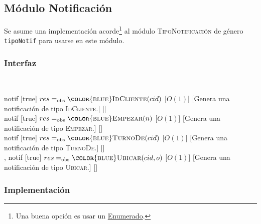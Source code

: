\subsection{Módulo Notificación}
Se asume una implementación acorde\footnote{Una buena opción es usar un \href{https://en.wikipedia.org/wiki/Enumerated_type}{Enumerado}.} al módulo \textsc{TipoNotificación} de género \texttt{tipoNotif} para usarse en este módulo.
\begin{interfaz}{\subsubsection{Interfaz}}
  \\
  \usa{\falta}
  \par\noindent
  \begin{operaciones}
    {}{notif}
    [true]
    {$res\igobs\textsc{\color{blue}IdCliente}(cid)$}
    [$O(1)$]
    [Genera una notificación de tipo \textsc{\color{teal}IdCliente}.]
    [\falta]\\

    \noindent{}
    {}{notif}
    [true]
    {$res\igobs\textsc{\color{blue}Empezar}(n)$}
    [$O(1)$]
    [Genera una notificación de tipo \textsc{\color{teal}Empezar}.]
    [\falta]\\

    \noindent{}
    {}{notif}
    [true]
    {$res\igobs\textsc{\color{blue}TurnoDe}(cid)$}
    [$O(1)$]
    [Genera una notificación de tipo \textsc{\color{teal}TurnoDe}.]
    [\falta]\\

    \noindent{}
    {, }{notif}
    [true]
    {$res\igobs\textsc{\color{blue}Ubicar}(cid,o)$}
    [$O(1)$]
    [Genera una notificación de tipo \textsc{\color{teal}Ubicar}.]
    [\falta]\\
  \end{operaciones}
\end{interfaz}
\subsubsection{Implementación}

